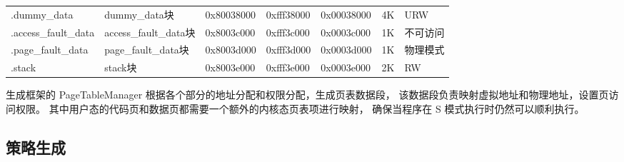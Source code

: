 \begin{table}[h!]
\begin{center}
{\begin{tabular}{|l|l|l|l|l|l|l|}
            .dummy\_data &   dummy\_data块&   0x80038000  &   0xfff38000      &   0x00038000      &   4K  &   URW              \\
            .access\_fault\_data  &   access\_fault\_data块 &   0x8003c000  &   0xfff3c000  &   0x0003c000  &   1K  &   不可访问 \\
            .page\_fault\_data    &   page\_fault\_data块   &   0x8003d000  &   0xfff3d000  &   0x0003d000  &   1K  &   物理模式 \\
            .stack      &   stack块     &   0x8003e000  &   0xfff3e000  &   0x0003e000  &   2K  &  RW \\
            \hline
        \end{tabular}
    }
    \end{center}
\end{table}

\begin{table}[h!]
    \begin{center} 
    \caption{group的.swap\_text包含的代码块} 
    \label{table:group-dist}  
    \end{center}
\end{table}

生成框架的 PageTableManager 根据各个部分的地址分配和权限分配，生成页表数据段，
该数据段负责映射虚拟地址和物理地址，设置页访问权限。
其中用户态的代码页和数据页都需要一个额外的内核态页表项进行映射，
确保当程序在 S 模式执行时仍然可以顺利执行。\par

\subsection{策略生成}

